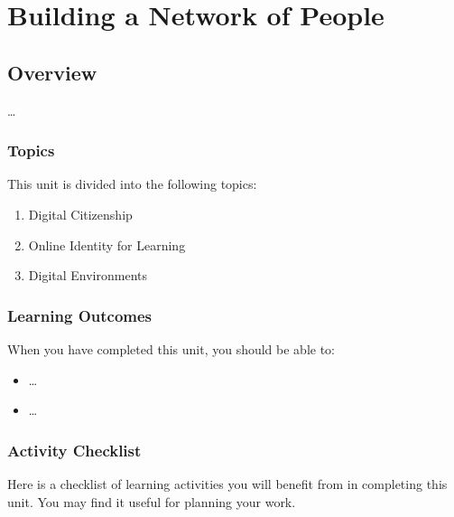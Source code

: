 \documentclass[
]{book}
\providecommand{\tightlist}{%
  \setlength{\itemsep}{0pt}\setlength{\parskip}{0pt}}
\theoremstyle{definition}
\theoremstyle{definition}
\theoremstyle{definition}
\theoremstyle{definition}
\theoremstyle{remark}
\begin{document}
\hypertarget{building-a-network-of-people}{%
\chapter{Building a Network of People}\label{building-a-network-of-people}}

\hypertarget{overview-4}{%
\section*{Overview}\label{overview-4}}

\ldots{}

\hypertarget{topics-4}{%
\subsection*{Topics}\label{topics-4}}

This unit is divided into the following topics:

\begin{enumerate}
\def\labelenumi{\arabic{enumi}.}
\tightlist
\item
  Digital Citizenship
\item
  Online Identity for Learning
\item
  Digital Environments
\end{enumerate}

\hypertarget{learning-outcomes-4}{%
\subsection*{Learning Outcomes}\label{learning-outcomes-4}}

When you have completed this unit, you should be able to:

\begin{itemize}
\tightlist
\item
  \ldots{}
\item
  \ldots{}
\end{itemize}

\hypertarget{activity-checklist-4}{%
\subsection*{Activity Checklist}\label{activity-checklist-4}}

Here is a checklist of learning activities you will benefit from in completing this unit. You may find it useful for planning your work.
\end{document}
